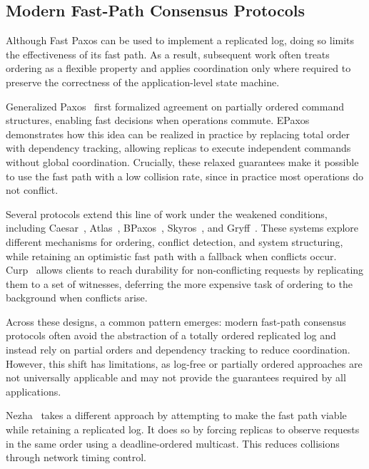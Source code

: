 \subsection{Modern Fast-Path Consensus Protocols}
Although Fast Paxos can be used to implement a replicated log, doing so limits the effectiveness of its fast path. As a result, subsequent work often treats ordering as a flexible property and applies coordination only where required to preserve the correctness of the application-level state machine.

Generalized Paxos~\cite{Lamport-GeneralizedPaxos-2005} first formalized agreement on partially ordered command structures, enabling fast decisions when operations commute. EPaxos~\cite{Moraru-Epaxos-2013} demonstrates how this idea can be realized in practice by replacing total order with dependency tracking, allowing replicas to execute independent commands without global coordination. Crucially, these relaxed guarantees make it possible to use the fast path with a low collision rate, since in practice most operations do not conflict.

Several protocols extend this line of work under the weakened conditions, including Caesar~\cite{Arun-Caesar-2017}, Atlas~\cite{Enes-Atlas-2020}, BPaxos~\cite{Tollman-BPaxos-2021}, Skyros~\cite{Ganesan-Skyros-2023}, and Gryff~\cite{Burke-Gryff-2020}. These systems explore different mechanisms for ordering, conflict detection, and system structuring, while retaining an optimistic fast path with a fallback when conflicts occur. Curp~\cite{Park-Curp-2019} allows clients to reach durability for non-conflicting requests by replicating them to a set of witnesses, deferring the more expensive task of ordering to the background when conflicts arise.

Across these designs, a common pattern emerges: modern fast-path consensus protocols often avoid the abstraction of a totally ordered replicated log and instead rely on partial orders and dependency tracking to reduce coordination. However, this shift has limitations, as log-free or partially ordered approaches are not universally applicable and may not provide the guarantees required by all applications.

Nezha~\cite{Geng-NezhaConsensus-2022} takes a different approach by attempting to make the fast path viable while retaining a replicated log. It does so by forcing replicas to observe requests in the same order using a deadline-ordered multicast. This reduces collisions through network timing control.

